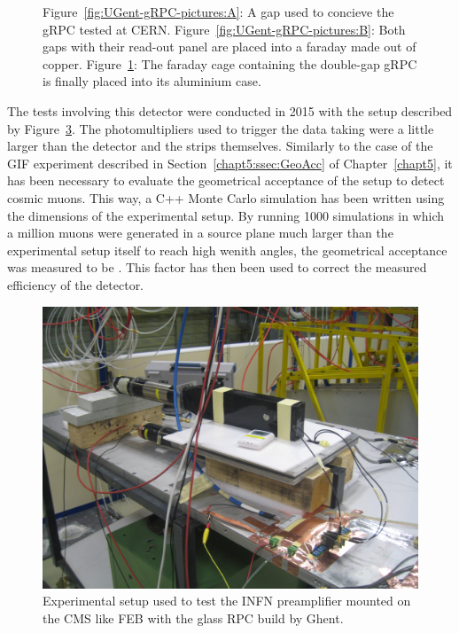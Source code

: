\begin{figure}[H]
\begin{subfigure}{\linewidth}
			\caption{\label{fig:UGent-gRPC-pictures:C}}
		\end{subfigure}
		\caption{\label{fig:UGent-gRPC-pictures} Figure~\ref{fig:UGent-gRPC-pictures:A}: A gap used to concieve the gRPC tested at CERN. Figure~\ref{fig:UGent-gRPC-pictures:B}: Both gaps with their read-out panel are placed into a faraday made out of copper. Figure~\ref{fig:UGent-gRPC-pictures:C}: The faraday cage containing the double-gap gRPC is finally placed into its aluminium case.}
    \end{figure}
    
    The tests involving this detector were conducted in 2015 with the setup described by Figure~\ref{fig:Setup-INFN-gRPC}. The photomultipliers used to trigger the data taking were a little larger than the detector and the strips themselves. Similarly to the case of the GIF experiment described in Section~\ref{chapt5:ssec:GeoAcc} of Chapter~\ref{chapt5}, it has been necessary to evaluate the geometrical acceptance of the setup to detect cosmic muons. This way, a C++ Monte Carlo simulation has been written using the dimensions of the experimental setup. By running 1000 simulations in which a million muons were generated in a source plane much larger than the experimental setup itself to reach high wenith angles, the geometrical acceptance was measured to be . This factor has then been used to correct the measured efficiency of the detector.
	
	\begin{figure}[H]
		\centering
		\includegraphics[width=.7\linewidth]{fig/chapt6/Setup_ATLAS_gRPC.JPG}
		\caption{\label{fig:Setup-INFN-gRPC} Experimental setup used to test the INFN preamplifier mounted on the CMS like FEB with the glass RPC build by Ghent.}
	\end{figure}
    

